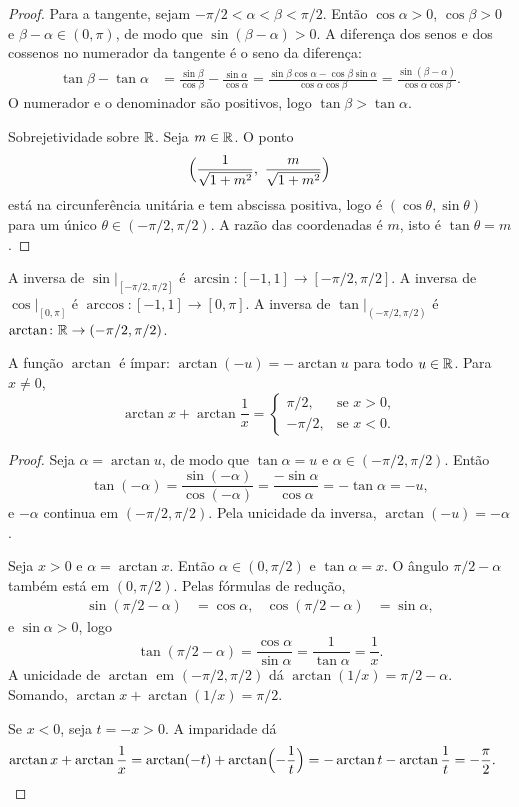 \documentclass[11pt,a4paper]{article}
\begin{document}
\begin{proof}
Para a tangente, sejam $-\pi/2<\alpha<\beta<\pi/2$. Então $\cos\alpha>0$, $\cos\beta>0$ e $\beta-\alpha\in(0,\pi)$, de modo que $\sin(\beta-\alpha)>0$. A diferença dos senos e dos cossenos no numerador da tangente é o seno da diferença:
\begin{align*}
\tan\beta-\tan\alpha
&=\frac{\sin\beta}{\cos\beta}-\frac{\sin\alpha}{\cos\alpha}
=\frac{\sin\beta\cos\alpha-\cos\beta\sin\alpha}{\cos\alpha\cos\beta}
=\frac{\sin(\beta-\alpha)}{\cos\alpha\cos\beta}.
\end{align*}
O numerador e o denominador são positivos, logo $\tan\beta>\tan\alpha$.

Sobrejetividade sobre $\mathbb{R}$. Seja $m\in\mathbb{R}$. O ponto
\[
\Bigl(\frac{1}{\sqrt{1+m^2}},\ \frac{m}{\sqrt{1+m^2}}\Bigr)
\]
está na circunferência unitária e tem abscissa positiva, logo é $(\cos\theta,\sin\theta)$ para um único $\theta\in(-\pi/2,\pi/2)$. A razão das coordenadas é $m$, isto é $\tan\theta=m$.
\end{proof}

\begin{definicao}
A inversa de $\sin\big|_{[-\pi/2,\pi/2]}$ é $\arcsin\colon[-1,1]\to[-\pi/2,\pi/2]$. A inversa de $\cos\big|_{[0,\pi]}$ é $\arccos\colon[-1,1]\to[0,\pi]$. A inversa de $\tan\big|_{(-\pi/2,\pi/2)}$ é $\arctan\colon\mathbb{R}\to(-\pi/2,\pi/2)$.
\end{definicao}

\begin{teorema}\label{teo:arctan-soma}
A função $\arctan$ é ímpar: $\arctan(-u)=-\arctan u$ para todo $u\in\mathbb{R}$. Para $x\neq 0$,
\[
\arctan x+\arctan\frac{1}{x}=
\begin{cases}
\pi/2,&\text{se }x>0,\\
-\pi/2,&\text{se }x<0.
\end{cases}
\]
\end{teorema}

\begin{proof}
Seja $\alpha=\arctan u$, de modo que $\tan\alpha=u$ e $\alpha\in(-\pi/2,\pi/2)$. Então
\[
\tan(-\alpha)=\frac{\sin(-\alpha)}{\cos(-\alpha)}=\frac{-\sin\alpha}{\cos\alpha}=-\tan\alpha=-u,
\]
e $-\alpha$ continua em $(-\pi/2,\pi/2)$. Pela unicidade da inversa, $\arctan(-u)=-\alpha$.

Seja $x>0$ e $\alpha=\arctan x$. Então $\alpha\in(0,\pi/2)$ e $\tan\alpha=x$. O ângulo $\pi/2-\alpha$ também está em $(0,\pi/2)$. Pelas fórmulas de redução,
\begin{align*}
\sin(\pi/2-\alpha)&=\cos\alpha,&
\cos(\pi/2-\alpha)&=\sin\alpha,
\end{align*}
e $\sin\alpha>0$, logo
\[
\tan(\pi/2-\alpha)=\frac{\cos\alpha}{\sin\alpha}=\frac{1}{\tan\alpha}=\frac{1}{x}.
\]
A unicidade de $\arctan$ em $(-\pi/2,\pi/2)$ dá $\arctan(1/x)=\pi/2-\alpha$. Somando, $\arctan x+\arctan(1/x)=\pi/2$.

Se $x<0$, seja $t=-x>0$. A imparidade dá
\begin{align*}
\arctan x+\arctan\frac{1}{x}
&=\arctan(-t)+\arctan\Bigl(-\frac{1}{t}\Bigr)
=-\arctan t-\arctan\frac{1}{t}
=-\frac{\pi}{2}.
\end{align*}
\end{proof}
\end{document}
